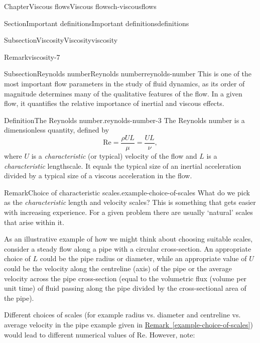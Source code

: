 \documentclass[oneside,10pt,]{book}
\newcommand{\xreffont}{\relax}
\newcommand{\ptxlistdisc}{\raisebox{0.3ex}{\textbullet}}
\numberwithin{equation}{section}
\begin{document}
\begin{chapterptx}{Chapter}{Viscous flows}{}{Viscous flows}{}{}{ch-viscousflows}
\begin{sectionptx}{Section}{Important definitions}{}{Important definitions}{}{}{definitions}
\begin{subsectionptx}{Subsection}{Viscosity}{}{Viscosity}{}{}{viscosity}
\begin{remark}{Remark}{}{viscosity-7}
\end{remark}
\end{subsectionptx}
%
%
\typeout{************************************************}
\typeout{************************************************}
%
\begin{subsectionptx}{Subsection}{Reynolds number}{}{Reynolds number}{}{}{reynolds-number}
This is one of the most important flow parameters in the study of fluid dynamics, as its order of magnitude determines many of the qualitative features of the flow. In a given flow, it quantifies the relative importance of inertial and viscous effects.%
\begin{definition}{Definition}{The Reynolds number.}{}{reynolds-number-3}%
The Reynolds number is a dimensionless quantity, defined by%
\begin{equation*}
\textrm{Re} = \frac{\rho U L}{\mu} = \frac{U L}{\nu},
\end{equation*}
where \(U\) is a \emph{characteristic} (or typical) velocity of the flow and \(L\) is a \emph{characteristic} lengthscale. It equals the typical size of an inertial acceleration divided by a typical size of a viscous acceleration in the flow.%
\end{definition}
\begin{remark}{Remark}{Choice of characteristic scales.}{example-choice-of-scales}%
What do we pick as the \emph{characteristic} length and velocity scales? This is something that gets easier with increasing experience. For a given problem there are usually ‘natural’ scales that arise within it.%
\par
As an illustrative example of how we might think about choosing suitable scales, consider a steady flow along a pipe with a circular cross-section. An appropriate choice of \(L\) could be the pipe radius or diameter, while an appropriate value of \(U\) could be the velocity along the centreline (axis) of the pipe or the average velocity across the pipe cross-section (equal to the volumetric flux (volume per unit time) of fluid passing along the pipe divided by the cross-sectional area of the pipe).%
\par
Different choices of scales (for example radius vs. diameter and centreline vs. average velocity in the pipe example given in \hyperref[example-choice-of-scales]{Remark~{\xreffont\ref{example-choice-of-scales}}}) would lead to different numerical values of \(\textrm{Re}\). However, note:%
\begin{itemize}[label=\ptxlistdisc]

\end{itemize}
\end{remark}
\end{subsectionptx}
\end{sectionptx}
\end{chapterptx}
\end{document}
